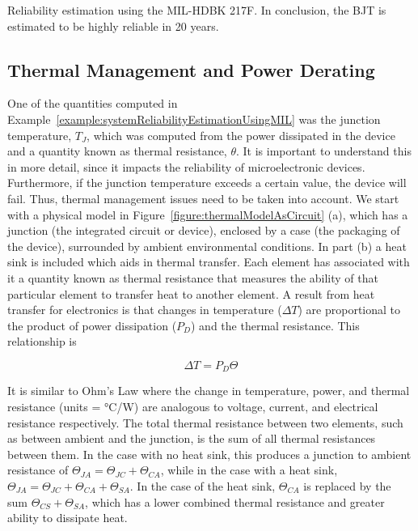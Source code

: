 {\begin{example}{Reliability estimation using the MIL-HDBK 217F.}
In conclusion, the BJT is estimated to be highly reliable in 20 years.

\end{example}



\subsection{Thermal Management and Power Derating}
\label{subsection:thermal-management-and-power-derating}

One of the quantities computed in 
Example~\ref{example:systemReliabilityEstimationUsingMIL} was the junction
temperature, $T_J$, which was computed from the
power dissipated in the device and a quantity known as thermal
resistance, $\theta$. It is important to understand this in more detail,
since it impacts the reliability of microelectronic devices.
Furthermore, if the junction temperature exceeds a certain value, the
device will fail. Thus, thermal management issues need to be taken into
account. We start with a physical model in 
Figure~\ref{figure:thermalModelAsCircuit} (a), which has a
junction (the integrated circuit or device), enclosed by a case (the
packaging of the device), surrounded by ambient environmental
conditions. In part (b) a heat sink is included which aids in thermal
transfer. Each element has associated with it a quantity known as
thermal resistance that measures the ability of that particular element
to transfer heat to another element. A result from heat transfer for
electronics is that changes in temperature ($\Delta T$) are proportional
to the product of power dissipation ($P_D$) and the thermal resistance.
This relationship is

\begin{equation}
\label{equ:thermalHeatFlow}
\Delta T = P_D \Theta
\end{equation}

It is similar to Ohm's Law where the change in temperature, power, and
thermal resistance (units = °C/W) are analogous to voltage, current, and
electrical resistance respectively. The total thermal resistance between
two elements, such as between ambient and the junction, is the sum of
all thermal resistances between them. In the case with no heat sink,
this produces a junction to ambient resistance of
$\Theta_{JA} =  \Theta_{JC} + \Theta_{CA}$, while in the case with a heat
sink, 
$\Theta_{JA} = \Theta_{JC} + \Theta_{CA} + \Theta_{SA}$. In the case 
of the heat sink, $\Theta_{CA}$ is replaced by the sum
$\Theta_{CS} + \Theta_{SA}$, which has a lower combined
thermal resistance and greater ability to dissipate heat.

}
